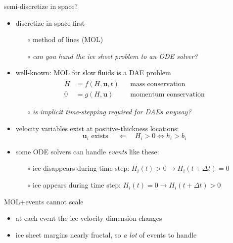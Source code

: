 \documentclass[hide notes,intlimits,usenames,dvipsnames]{beamer}
\begin{document}
\begin{frame}{semi-discretize in space?}

\begin{itemize}
\item discretize in space first
    \begin{itemize}
    \item[$\circ$] method of lines (MOL)
    \item[$\circ$] \emph{can you hand the ice sheet problem to an ODE solver?}
    \end{itemize}
\item well-known: MOL for slow fluids is a DAE problem
\begin{align*}
\dot H &= f(H,\mathbf{u},t) && \text{mass conservation} \\
     0 &= g(H,\mathbf{u})   && \text{momentum conservation}
\end{align*}
\vspace{-5mm}
    \begin{itemize}
    \item[$\circ$] \emph{is implicit time-stepping required for DAEs anyway?}
    \end{itemize}
\item velocity variables exist at positive-thickness locations:
    $$\mathbf{u}_i \text{ exists } \quad \Longleftarrow \quad H_i > 0 \iff h_i > b_i$$
\item some ODE solvers can handle \emph{events} like these:
    \begin{itemize}
    \item[$\circ$] ice disappears during time step:  $H_i(t)>0 \to H_i(t+\Delta t)=0$
    \item[$\circ$] ice appears during time step:  $H_i(t)=0 \to H_i(t+\Delta t)>0$
    \end{itemize}
\end{itemize}
\end{frame}


\begin{frame}{MOL$+$events cannot scale}

\begin{center}

\end{center}

\vspace{-6mm}
\begin{itemize}
\item at each event the ice velocity dimension changes
\item ice sheet margins nearly fractal, so \emph{a lot} of events to handle
\end{itemize}
\end{frame}
\end{document}
